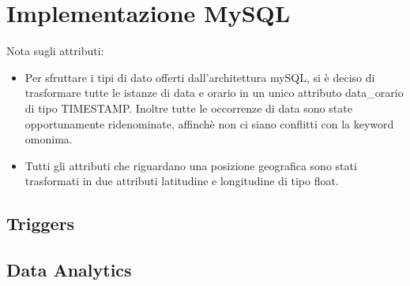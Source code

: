 \documentclass[12pt,a4paper]{article}
\begin{document}
\section{Implementazione MySQL}
Nota sugli attributi:
\begin{itemize}
\item Per sfruttare i tipi di dato offerti dall'architettura mySQL, si è deciso di trasformare tutte le istanze di data e orario in un unico attributo data\_orario di tipo TIMESTAMP.
Inoltre tutte le occorrenze di data sono state opportunamente ridenominate, affinchè non ci siano conflitti con la keyword omonima.
\item Tutti gli attributi che riguardano una posizione geografica sono stati trasformati in due attributi latitudine e longitudine di tipo float.
\end{itemize}
\subsection{Triggers}
\subsection{Data Analytics}
\end{document}
